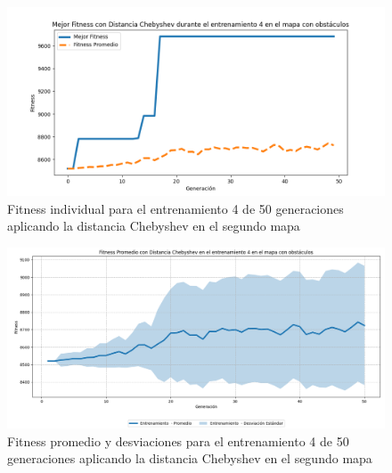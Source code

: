 \documentclass[lettersize, journal]{IEEEtran}
\begin{document}
\begin{figure}[H]
    \centering
    \includegraphics[width=0.9 \linewidth]{Chebyshev/Mapa2/Fitness_4_Map2_Cheby_50Gen.png}
    \caption{Fitness individual para el entrenamiento 4 de 50 generaciones aplicando la distancia Chebyshev en el segundo mapa}
    \label{fig:cheb_4_50_m2}
\end{figure}
\begin{figure}[H]
    \centering
    \includegraphics[width=0.9 \linewidth]{Chebyshev/Mapa2/Fitness_4_Map2_Cheby_50Gen_Sombra.png}
    \caption{Fitness promedio y desviaciones para el entrenamiento 4 de 50 generaciones aplicando la distancia Chebyshev en el segundo mapa}
    \label{fig:cheb_4_50_sombra_m2}
\end{figure}
\end{document}
